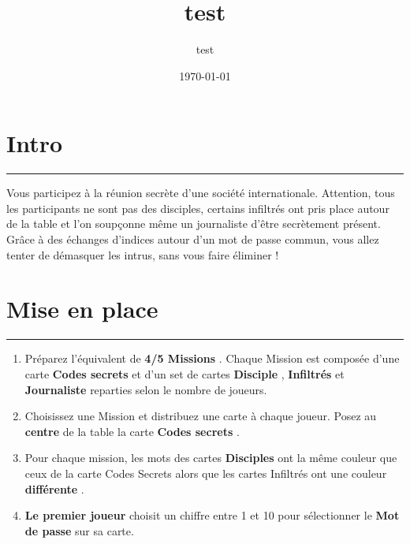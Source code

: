 \documentclass{article}%
\title{test}%
\author{test}%
\date{\today}%
\begin{document}
%
\normalsize%
\maketitle\thispagestyle{header}%
\pagestyle{header}%
\sectionfont{\color{blue}}%
\subsectionfont{\color{blue}}%
\subsubsectionfont{\color{blue}}%
\section{ Intro
}%
\label{sec:Intro}%
\textcolor{blue}{\rule{18cm}{0.07cm}}\break%
Vous participez à la réunion secrète d'une société internationale. Attention, tous les participants ne sont pas des disciples, certains infiltrés ont pris place autour de la table et l'on soupçonne même un journaliste d'être secrètement présent. Grâce à des échanges d'indices autour d'un mot de passe commun, vous allez tenter de démasquer les intrus, sans vous faire éliminer !


%
\sectionfont{\color{mygreen}}%
\subsectionfont{\color{mygreen}}%
\subsubsectionfont{\color{mygreen}}%
\section{ Mise en place
}%
\label{sec:Miseenplace}%
\textcolor{mygreen}{\rule{18cm}{0.07cm}}\break%
\begin{enumerate}%
\item%
%
 Préparez l'équivalent de %
\textcolor{mygreen}{%
\textbf{4/5 Missions}%
}%
. Chaque Mission est composée d'une carte %
\textcolor{mygreen}{%
\textbf{Codes secrets}%
}%
\textit{ }%
 et d'un set de cartes %
\textcolor{mygreen}{%
\textbf{Disciple}%
}%
,%
\textcolor{mygreen}{%
\textbf{ Infiltrés}%
}%
\textit{ }%
 et %
\textcolor{mygreen}{%
\textbf{Journaliste}%
}%
\textit{ }%
 reparties selon le nombre de joueurs.
%
\item%
%
 Choisissez une Mission et distribuez une carte à chaque joueur. Posez au %
\textcolor{mygreen}{%
\textbf{centre}%
}%
\textit{ }%
 de la table la carte %
\textcolor{mygreen}{%
\textbf{Codes secrets}%
}%
.
%
\item%
%
 Pour chaque mission, les mots des cartes %
\textcolor{mygreen}{%
\textbf{Disciples}%
}%
\textit{ }%
 ont la même couleur que ceux de la carte Codes Secrets alors que les cartes Infiltrés ont une couleur %
\textcolor{mygreen}{%
\textbf{différente}%
}%
.
%
\item%
%
\textcolor{mygreen}{%
\textbf{Le premier joueur}%
}%
\textit{ }%
 choisit un chiffre entre 1 et 10 pour sélectionner le %
\textcolor{mygreen}{%
\textbf{Mot de passe}%
}%
\textit{ }%
 sur sa carte.
%
\end{enumerate}
\end{document}
